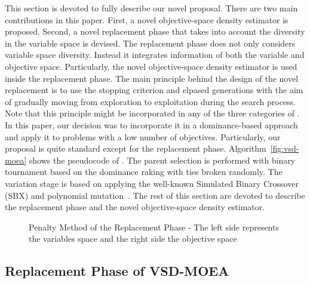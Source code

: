 This section is devoted to fully describe our novel proposal.
%
There are two main contributions in this paper.
%
First, a novel objective-space density estimator is proposed.
%
Second, a novel replacement phase that takes into account the diversity in the variable space is devised.
%
The replacement phase does not only considers variable space diversity.
%
Instead it integrates information of both the variable and objective space.
%
Particularly, the novel objective-space density estimator is used inside the replacement phase.
%
The main principle behind the design of the novel replacement is to use the stopping criterion and 
elpased generations with the aim of gradually moving from exploration to exploitation during the search process.
%
Note that this principle might be incorporated in any of the three categories of \MOEAS{}.
%
In this paper, our decision was to incorporate it in a dominance-based approach and apply it to problems with 
a low number of objectives.
%
Particularly, our proposal is quite standard except for the replacement phase.
%
Algorithm~\ref{fig:vsd-moea} shows the pseudocode of \VSDMOEA{}.
%
The parent selection is performed with binary tournament based on the dominance raking with ties broken randomly.
%
The variation stage is based on applying the well-known Simulated Binary Crossover (SBX) 
and polynomial mutation~\cite{Joel:SBX1994, Joel:Mutation}.
%
The rest of this section are devoted to describe the replacement phase and the novel objective-space density 
estimator.

\begin{figure}[t]
\centering

\caption{Penalty Method of the Replacement Phase - The left side represents the variables space and the right side the 
objective space}
\label{fig:Hypersphere}
\end{figure}


\subsection{Replacement Phase of VSD-MOEA}

